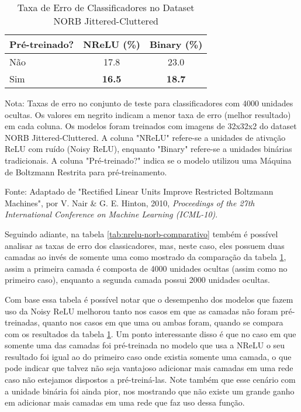 \begin{table}[ht]
    \centering
    \begin{threeparttable}
        \caption{Taxa de Erro de Classificadores no Dataset NORB Jittered-Cluttered}
        \label{tab:norb-error-rate}
        \begin{tabular}{lcc}
            \toprule
            \textbf{Pré-treinado?} & \textbf{NReLU (\%)} & \textbf{Binary (\%)} \\
            \midrule
            
            Não & 17.8 & 23.0 \\
            Sim & \textbf{16.5} & \textbf{18.7} \\
            
            \bottomrule
        \end{tabular}
        
        \begin{tablenotes}[para]
            \small
            \item[] Nota: Taxas de erro no conjunto de teste para classificadores com 4000 unidades ocultas. Os valores em negrito indicam a menor taxa de erro (melhor resultado) em cada coluna. Os modelos foram treinados com imagens de 32x32x2 do dataset NORB Jittered-Cluttered. A coluna "NReLU" refere-se a unidades de ativação ReLU com ruído (Noisy ReLU), enquanto "Binary" refere-se a unidades binárias tradicionais. A coluna "Pré-treinado?" indica se o modelo utilizou uma Máquina de Boltzmann Restrita para pré-treinamento.
            \item[] Fonte: Adaptado de "Rectified Linear Units Improve Restricted Boltzmann Machines", por V. Nair \& G. E. Hinton, 2010, \textit{Proceedings of the 27th International Conference on Machine Learning (ICML-10)}.
        \end{tablenotes}
        
    \end{threeparttable}
\end{table}

Seguindo adiante, na tabela \ref{tab:nrelu-norb-comparativo} tembém é possível analisar as taxas de erro dos classicadores, mas, neste caso, eles possuem duas camadas ao invés de somente uma como mostrado da comparação da tabela \ref{tab:norb-error-rate}, assim a primeira camada é composta de 4000 unidades ocultas (assim como no primeiro caso), enquanto a segunda camada possui 2000 unidades ocultas. 

Com base essa tabela é possível notar que o desempenho dos modelos que fazem uso da Noisy ReLU melhorou tanto nos casos em que as camadas não foram pré-treinadas, quanto nos casos em que uma ou ambas foram, quando se compara com os resultados da tabela \ref{tab:norb-error-rate}. Um ponto interessante disso é que no caso em que somente uma das camadas foi pré-treinada no modelo que usa a NReLU o seu resultado foi igual ao do primeiro caso onde existia somente uma camada, o que pode indicar que talvez não seja vantajoso adicionar mais camadas em uma rede caso não estejamos dispostos a pré-treiná-las. Note também que esse cenário com a unidade binária foi ainda pior, nos mostrando que não existe um grande ganho em adicionar mais camadas em uma rede que faz uso dessa função.

